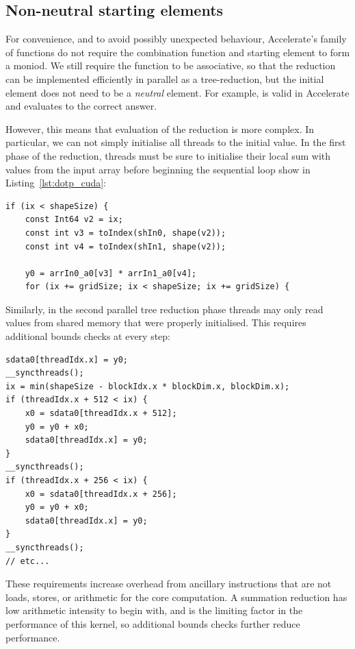 \subsection{Non-neutral starting elements}
\label{sec:non-neutral_starting_elements}

For convenience, and to avoid possibly unexpected behaviour, Accelerate's
 family of functions do not require the combination function and
starting element to form a moniod. We still require the function to be
associative, so that the reduction can be implemented efficiently in parallel as
a tree-reduction, but the initial element does not need to be a \emph{neutral}
element. For example,  is valid in
Accelerate and evaluates to the correct answer.

However, this means that evaluation of the reduction is more complex. In
particular, we can not simply initialise all threads to the initial value.
In the first phase of the reduction, threads must be sure to initialise
their local sum  with values from the input array before beginning the
sequential loop show in Listing~\ref{lst:dotp_cuda}:
%
\begin{lstlisting}[style=cuda,firstnumber=12]
if (ix < shapeSize) {
    const Int64 v2 = ix;
    const int v3 = toIndex(shIn0, shape(v2));
    const int v4 = toIndex(shIn1, shape(v2));

    y0 = arrIn0_a0[v3] * arrIn1_a0[v4];
    for (ix += gridSize; ix < shapeSize; ix += gridSize) {
\end{lstlisting}

Similarly, in the second parallel tree reduction phase threads may only read
values from shared memory that were properly initialised. This requires
additional bounds checks at every step:
%
\begin{lstlisting}[style=cuda,firstnumber=27]
sdata0[threadIdx.x] = y0;
__syncthreads();
ix = min(shapeSize - blockIdx.x * blockDim.x, blockDim.x);
if (threadIdx.x + 512 < ix) {
    x0 = sdata0[threadIdx.x + 512];
    y0 = y0 + x0;
    sdata0[threadIdx.x] = y0;
}
__syncthreads();
if (threadIdx.x + 256 < ix) {
    x0 = sdata0[threadIdx.x + 256];
    y0 = y0 + x0;
    sdata0[threadIdx.x] = y0;
}
__syncthreads();
// etc...
\end{lstlisting}

These requirements increase overhead from ancillary instructions that are not
loads, stores, or arithmetic for the core computation. A summation reduction has
low arithmetic intensity to begin with, and is the limiting factor in the
performance of this kernel, so additional bounds checks further reduce
performance.

